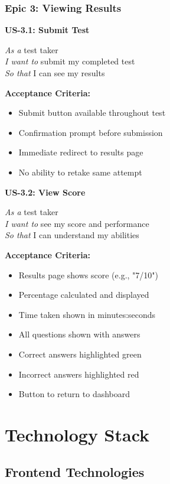\documentclass[12pt,a4paper]{report}
\begin{document}
\subsection{Epic 3: Viewing Results}

\textbf{US-3.1: Submit Test}

\textit{As a} test taker \\
\textit{I want to} submit my completed test \\
\textit{So that} I can see my results

\textbf{Acceptance Criteria:}
\begin{itemize}
    \item Submit button available throughout test
    \item Confirmation prompt before submission
    \item Immediate redirect to results page
    \item No ability to retake same attempt
\end{itemize}

\textbf{US-3.2: View Score}

\textit{As a} test taker \\
\textit{I want to} see my score and performance \\
\textit{So that} I can understand my abilities

\textbf{Acceptance Criteria:}
\begin{itemize}
    \item Results page shows score (e.g., "7/10")
    \item Percentage calculated and displayed
    \item Time taken shown in minutes:seconds
    \item All questions shown with answers
    \item Correct answers highlighted green
    \item Incorrect answers highlighted red
    \item Button to return to dashboard
\end{itemize}

\chapter{Technology Stack}

\section{Frontend Technologies}
\end{document}
